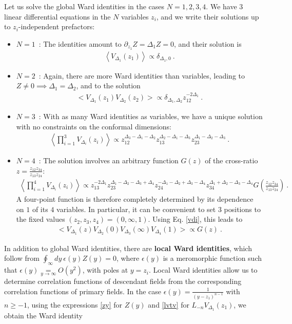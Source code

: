 \documentclass[12pt, a4paper]{article}
\theoremstyle{break}
\begin{document}
Let us solve the global Ward identities in the cases $N=1,2,3,4$. We have $3$ linear differential equations in the $N$ variables $z_i$, and we write their solutions up to $z_i$-independent prefactors:
\begin{itemize}
 \item $\boxed{N=1}$\ : The identities amount to $\partial_{z_1} Z = \Delta_1 Z=0$, and their solution is 
 \begin{align}
  \left<V_{\Delta_1}(z_1)\right>\propto \delta_{\Delta_1,0}\ . 
 \end{align}
 \item $\boxed{N=2}$\ : Again, there are more Ward identities than variables, leading to $Z\neq 0\implies \Delta_1=\Delta_2$, and to the solution
 \begin{align}
 \Big< V_{\Delta_1}(z_1)V_{\Delta_2}(z_2) \Big> \propto \delta_{\Delta_1,\Delta_2} z_{12}^{-2\Delta_1} \ .
 \label{2pt}
\end{align}
\item $\boxed{N=3}$\ : With as many Ward identities as variables, we have a unique solution with no constraints on the conformal dimensions:
\begin{align}
 \left< \prod_{i=1}^3 V_{\Delta_i}(z_i) \right> \propto z_{12}^{\Delta_3-\Delta_1-\Delta_2} z_{13}^{\Delta_2-\Delta_1-\Delta_3} z_{23}^{\Delta_1-\Delta_2-\Delta_3}\ .
 \label{3pt}
\end{align}
\item $\boxed{N=4}$\ : The solution involves an arbitrary function $G(z)$ of the cross-ratio $z=\frac{z_{12}z_{34}}{z_{13}z_{24}}$:
\begin{align}
 \left< \prod_{i=1}^4 V_{\Delta_i}(z_i) \right> 
 \propto z_{13}^{-2\Delta_1} z_{23}^{\Delta_1-\Delta_2-\Delta_3+\Delta_4} z_{24}^{-\Delta_1-\Delta_2+\Delta_3-\Delta_4} z_{34}^{\Delta_1+\Delta_2-\Delta_3-\Delta_4} G\left(\frac{z_{12}z_{34}}{z_{13}z_{24}}\right)\ .
 \label{4pt}
\end{align}
A four-point function is therefore completely determined by its dependence on $1$ of its $4$ variables. In particular, it can be convenient to set $3$ positions to the fixed values $(z_2,z_3,z_4)=(0,\infty,1)$. Using Eq. \eqref{vdi}, this leads to 
\begin{align}
 \Big< V_{\Delta_1}(z) V_{\Delta_2}(0)V_{\Delta_3}(\infty)V_{\Delta_4}(1) \Big> \propto G(z)\ . 
\end{align}
\end{itemize}
In addition to global Ward identities, there are \textbf{local Ward identities}, which follow from $\oint_\infty dy\ \epsilon(y)Z(y)=0$, where $\epsilon(y)$ is a meromorphic function such that $\epsilon(y)\underset{y\to\infty}{=}O(y^2)$, with poles at $y=z_i$. Local Ward identities allow us to determine correlation functions of descendant fields from the corresponding correlation functions of primary fields. In the case $\epsilon(y) = \frac{1}{(y-z_1)^{n-1}}$ with $n\geq -1$, using the expressions \eqref{zy} for $Z(y)$ and \eqref{lvtv} for $L_{-n}V_{\Delta_1}(z_1)$, we obtain the Ward identity
\end{document}
